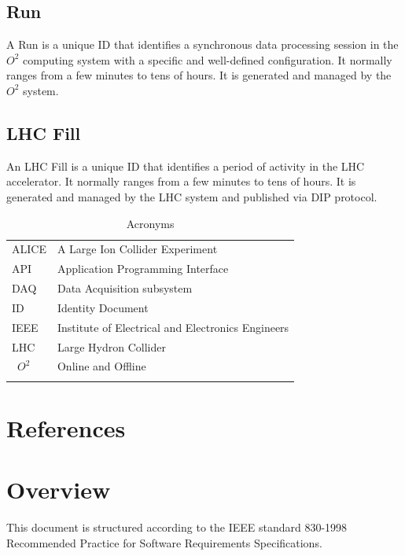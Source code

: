 \subsection{Run}
A Run is a unique ID that identifies a synchronous data processing session in the $O^2$ computing system with a specific and well-defined configuration. It normally ranges from a few minutes to tens of hours. It is generated and managed by the $O^2$ system. 

\subsection{LHC Fill}
An LHC Fill is a unique ID that identifies a period of activity in the LHC accelerator. It normally ranges from a few minutes to tens of hours. It is generated and managed by the LHC system and published via DIP protocol. 
 
\begin{table}[h]
\begin{center}
\begin{longtable}{ll}
    ALICE & A Large Ion Collider Experiment\\
    API & Application Programming Interface\\
    DAQ & Data Acquisition subsystem \\
    ID & Identity Document\\
    IEEE & Institute of Electrical and Electronics Engineers\\
     LHC  & Large Hydron Collider\\\
     $O^2$ & Online and Offline\\
     
       & \\
    \end{longtable}
      \caption{Acronyms}
  \label{tab:acronyms}
  \end{center}
  
\end{table}




\section{References}

\section{Overview}
This document is structured according to the IEEE standard 830-1998 Recommended Practice for Software Requirements Specifications.
